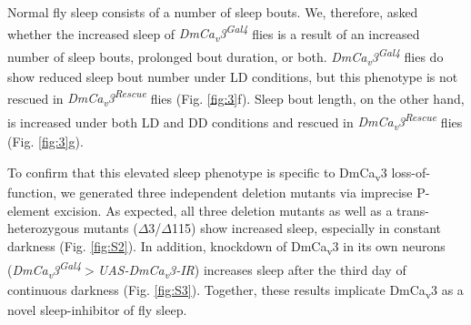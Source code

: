 Normal fly sleep consists of a number of sleep bouts.
We, therefore, asked whether the increased sleep of \emph{DmCa\textsubscript{v}3\textsuperscript{Gal4}} flies is a result of an increased number of sleep bouts, prolonged bout duration, or both.
\emph{DmCa\textsubscript{v}3\textsuperscript{Gal4}} flies do show reduced sleep bout number under LD conditions, but this phenotype is not rescued in \emph{DmCa\textsubscript{v}3\textsuperscript{Rescue}} flies (Fig. \ref{fig:3}f).
Sleep bout length, on the other hand, is increased under both LD and DD conditions and rescued in \emph{DmCa\textsubscript{v}3\textsuperscript{Rescue}} flies (Fig. \ref{fig:3}g).

To confirm that this elevated sleep phenotype is specific to DmCa\textsubscript{v}3 loss-of-function, we generated three independent deletion mutants via imprecise P-element excision.
As expected, all three deletion mutants as well as a trans-heterozygous mutants ($\Delta$3/$\Delta$115) show increased sleep, especially in constant darkness (Fig. \ref{fig:S2}).
In addition, knockdown of DmCa\textsubscript{v}3 in its own neurons (\emph{DmCa\textsubscript{v}3\textsuperscript{Gal4}$>${}UAS-DmCa\textsubscript{v}3-IR}) increases sleep after the third day of continuous darkness (Fig. \ref{fig:S3}).
Together, these results implicate DmCa\textsubscript{v}3 as a novel sleep-inhibitor of fly sleep.
  